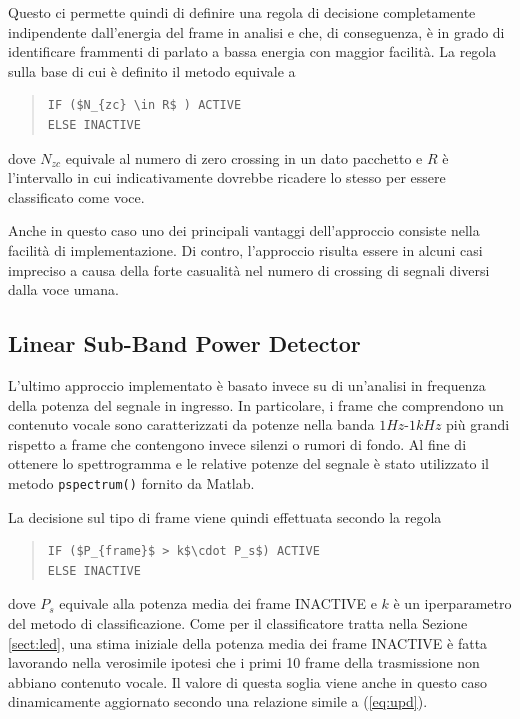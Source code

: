 \documentclass[10pt,twocolumn]{article}
\begin{document}
{\vspace{0.1cm}
Questo ci permette quindi di definire una regola di decisione completamente indipendente dall'energia del frame
in analisi e che, di conseguenza, è in grado di identificare frammenti di parlato a bassa energia con maggior
facilità. La regola sulla base di cui è definito il metodo equivale a
\begin{quote}
\begin{lstlisting}
IF ($N_{zc} \in R$ ) ACTIVE
ELSE INACTIVE
\end{lstlisting}
\end{quote}
dove $N_{zc}$ equivale al numero di zero crossing in un dato pacchetto e $R$ è l'intervallo in cui indicativamente dovrebbe ricadere lo stesso per essere classificato come voce.

\vspace{0.1cm}
Anche in questo caso uno dei principali vantaggi dell'approccio consiste nella facilità di implementazione. Di
contro, l'approccio risulta essere in alcuni casi impreciso a causa della forte casualità nel numero di crossing
di segnali diversi dalla voce umana.

\subsection{Linear Sub-Band Power Detector}
L'ultimo approccio implementato è basato invece su di un'analisi in frequenza della potenza del segnale in ingresso. In particolare, i frame che comprendono un contenuto vocale sono caratterizzati da potenze nella
banda $1Hz$-$1kHz$ più grandi rispetto a frame che contengono invece silenzi o rumori di fondo. Al fine di
ottenere lo spettrogramma e le relative potenze del segnale è stato utilizzato il metodo \texttt{pspectrum()}
fornito da Matlab.

\vspace{0.1cm}
La decisione sul tipo di frame viene quindi effettuata secondo la regola
\begin{quote}
\begin{lstlisting}
IF ($P_{frame}$ > k$\cdot P_s$) ACTIVE
ELSE INACTIVE
\end{lstlisting}
\end{quote}
\vspace{-0.2cm}
dove $P_s$ equivale alla potenza media dei frame INACTIVE e $k$ è un iperparametro del metodo di classificazione.
Come per il classificatore tratta nella Sezione \ref{sect:led}, una stima iniziale della potenza media dei frame INACTIVE è fatta lavorando nella verosimile ipotesi che i primi
10 frame della trasmissione non abbiano contenuto vocale. 
Il valore di questa soglia viene anche in questo caso dinamicamente aggiornato secondo una relazione simile a (\ref{eq:upd}).

}
\end{document}
